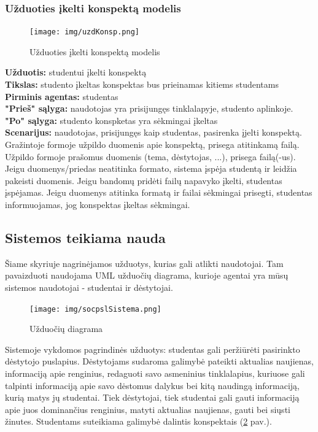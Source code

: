 \documentclass{VUMIFPSkursinis}
\begin{document}
\subsubsection{Užduoties įkelti konspektą modelis}
\begin{figure}[H]
\centering
\texttt{[image: img/uzdKonsp.png]}
\caption{Užduoties įkelti konspektą modelis}
\label{fig:konspektas}
\end{figure}
\textbf{Užduotis: } studentui įkelti konspektą\\
\textbf{Tikslas: } studento įkeltas konspektas bus prieinamas kitiems studentams\\
\textbf{Pirminis agentas: } studentas\\
\textbf{"Prieš" sąlyga: } naudotojas yra prisijungęs tinklalapyje, studento aplinkoje.\\
\textbf{"Po" sąlyga: } studento konspketas yra sėkmingai įkeltas\\
\textbf{Scenarijus: } naudotojas, prisijungęs kaip studentas, pasirenka įjelti konspektą. Gražintoje formoje užpildo duomenis apie konspektą, prisega atitinkamą failą. Užpildo formoje prašomus duomenis (tema, dėstytojas, ...), prisega failą(-us). Jeigu duomenys/priedas neatitinka formato, sistema įspėja studentą ir leidžia pakeisti duomenis. Jeigu bandomų pridėti failų napavyko įkelti, studentas įspėjamas. Jeigu duomenys atitinka formatą ir failai sėkmingai prisegti, studentas informuojamas, jog konspektas įkeltas sėkmingai.

\subsection{Sistemos teikiama nauda}
Šiame skyriuje nagrinėjamos užduotys, kurias gali atlikti naudotojai. Tam pavaizduoti naudojama UML užduočių diagrama, kurioje agentai yra mūsų sistemos naudotojai - studentai ir dėstytojai.
\begin{figure}[H]
\centering
\texttt{[image: img/socpslSistema.png]}
\caption{Užduočių diagrama}
\label{fig:uzdDiagram}
\end{figure}
Sistemoje vykdomos pagrindinės užduotys: studentas gali peržiūrėti pasirinkto dėstytojo puslapius. Dėstytojams sudaroma galimybė pateikti aktualias naujienas, informaciją apie renginius, redaguoti savo asmeninius tinklalapius, kuriuose gali talpinti informaciją apie savo dėstomus dalykus bei kitą naudingą informaciją, kurią matys jų studentai. Tiek dėstytojai, tiek studentai gali gauti informaciją apie juos dominančius renginius, matyti aktualias naujienas, gauti bei siųsti žinutes. Studentams suteikiama galimybė dalintis konspektais (\ref{fig:uzdDiagram} pav.).
\end{document}
